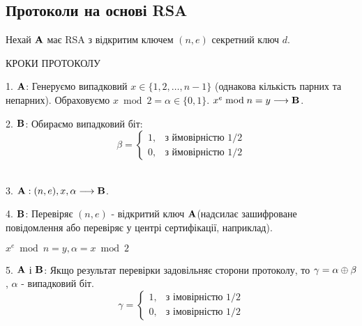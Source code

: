 \subsection{Протоколи на основі RSA}
Нехай $\bold{A}$ має RSA з відкритим ключем $(n, e)$ секретний ключ $d$.
\begin{center}
КРОКИ ПРОТОКОЛУ
\end{center}
\par1. $\bold{A}$: Генеруємо випадковий $x\in\{1, 2,\ldots, n-1\}$ (однакова кількість парних та непарних). Обраховуємо $x\bmod 2 = \alpha\in\{0,1\}$. $x^e\bmod n = y\longrightarrow \bold{B}$.\\
\par2. $\bold{B}$: Обираємо випадковий біт:
\begin{equation*}
\beta = 
	\begin{cases}
		1, &\text{з ймовірністю 1/2}\\
		0, &\text{з ймовірністю 1/2}
	\end{cases}
\end{equation*}\\
\par3. $\bold{A}: (n, e), x, \alpha \longrightarrow \bold{B}$.
\par4. $\bold{B}$: Перевіряє $(n, e)$ - відкритий ключ $\bold{A}$(надсилає зашифроване повідомлення або перевіряє у центрі сертифікації, наприклад).
\begin{center}
$x^e\bmod n = y, \alpha = x\bmod 2$
\end{center}
\par5. $\bold{A}$ і $\bold{B}$: Якщо результат перевірки задовільняє сторони протоколу, то $\gamma = \alpha \oplus \beta$, $\alpha$ - випадковий біт.
\begin{equation*}
\gamma = 
	\begin{cases}
		1, &\text{з імовірністю 1/2}\\
		0, &\text{з імовірністю 1/2}
	\end{cases}
\end{equation*}


%

